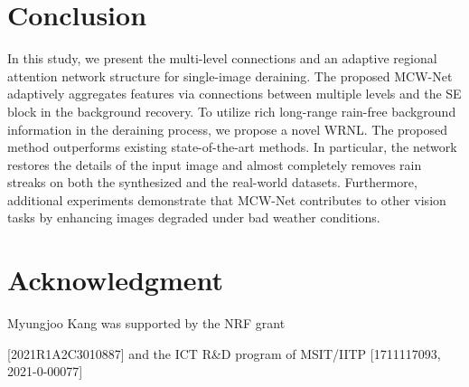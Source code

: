 \documentclass[a4paper,fleqn]{cas-dc}
\begin{document}
\section{Conclusion}
In this study, we present the multi-level connections and an adaptive regional attention network structure for single-image deraining. The proposed MCW-Net adaptively aggregates features via connections between multiple levels and the SE block in the background recovery. To utilize rich long-range rain-free background information in the deraining process, we propose a novel WRNL.
The proposed method outperforms existing state-of-the-art methods. In particular, the network restores the details of the input image and almost completely removes rain streaks on both the synthesized and the real-world datasets. Furthermore, additional experiments demonstrate that MCW-Net contributes to other vision tasks by enhancing images degraded under bad weather conditions.

\section*{Acknowledgment}
Myungjoo Kang was supported by the NRF grant

[2021R1A2C3010887] and the ICT R\&D program of
MSIT/IITP [1711117093, 2021-0-00077]























\printcredits





\bio{}
\endbio

\bio{}
\endbio
\end{document}
